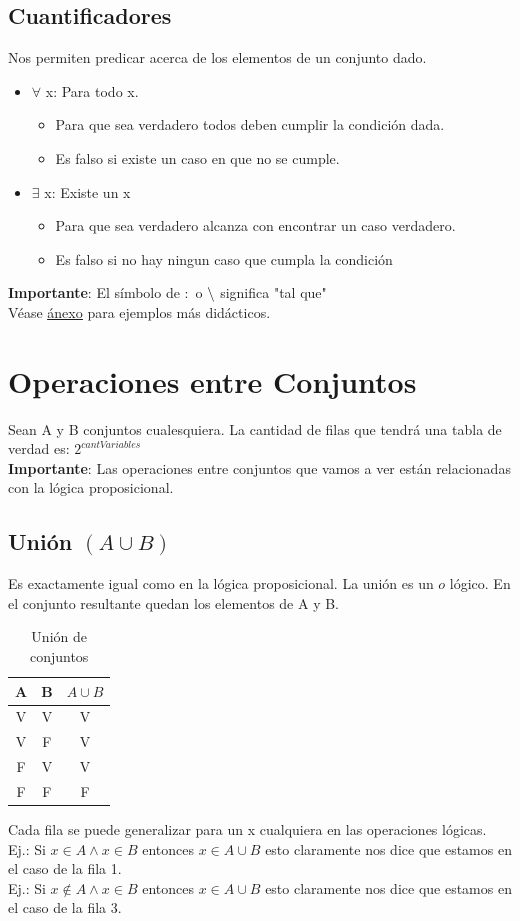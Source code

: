 \documentclass[10pt,a4paper]{article}
\begin{document}
\subsection*{Cuantificadores}
Nos permiten predicar acerca de los elementos de un conjunto dado. 
\begin{itemize}
    \item $\forall$ x: Para todo x.
    \begin{itemize}
        \item Para que sea verdadero todos deben cumplir la condición dada.
        \item Es falso si existe un caso en que no se cumple.
    \end{itemize}
    \item $\exists$ x: Existe un x
    \begin{itemize}
        \item Para que sea verdadero alcanza con encontrar un caso verdadero.
        \item Es falso si no hay ningun caso que cumpla la condición
    \end{itemize}
\end{itemize}
\textbf{Importante}: El símbolo de $:$ o $\symbol{92}$ significa "tal que" \\
Véase \hyperref[subsec:cuantificadores]{\underline{ánexo}} para ejemplos más didácticos.
\section*{Operaciones entre Conjuntos}
Sean A y B conjuntos cualesquiera. La cantidad de filas que tendrá una tabla de verdad es: \textbf{$2^{cantVariables}$} \\
\textbf{Importante}: Las operaciones entre conjuntos que vamos a ver están relacionadas con la lógica proposicional.
\newpage
\subsection*{Unión $(A \cup B)$}
Es exactamente igual como en la lógica proposicional. La unión es un $o$ lógico. En el conjunto resultante quedan los elementos de A y B. \\

\begin{table}[h!]
    \centering
    \begin{tabular}{|c | c | c|}
    \hline
    \textbf{A} & \textbf{B} & \textbf{$A \cup B$} \\[0.1cm]
    \hline
    V & V & V \\
    V & F & V \\
    F & V & V \\
    F & F & F \\
    \hline
    \end{tabular}
    \caption{Unión de conjuntos}
\end{table} 
Cada fila se puede generalizar para un x cualquiera en las operaciones lógicas. \\
Ej.: Si $x \in A \land x \in B$ entonces $ x \in A \cup B$ esto claramente nos dice que estamos en el caso de la fila 1. \\
Ej.: Si $x \notin A \land x \in B$ entonces $ x \in A \cup B$ esto claramente nos dice que estamos en el caso de la fila 3.
\end{document}
